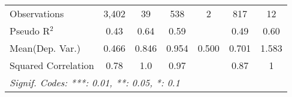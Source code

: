 \begin{tabular}{lcccccc}
   Observations                                               & 3,402         & 39      & 538           & 2    & 817           & 12\\  
   Pseudo R$^2$                                               & 0.43          & 0.64    & 0.59          &      & 0.49          & 0.60\\  
Mean(Dep. Var.) & 0.466 & 0.846 & 0.954 & 0.500 & 0.701 & 1.583 \\
   Squared Correlation                                        & 0.78          & 1.0     & 0.97          &      & 0.87          & 1\\  
   \midrule \midrule
   \multicolumn{7}{l}{\emph{Signif. Codes: ***: 0.01, **: 0.05, *: 0.1}}\\
\end{tabular}
\par\endgroup
